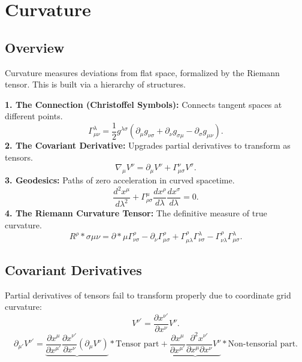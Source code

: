 \documentclass[11pt, a4paper]{report}
\begin{document}
\chapter{Curvature}

\section{Overview}
Curvature measures deviations from flat space, formalized by the Riemann tensor. This is built via a hierarchy of structures.

\textbf{1. The Connection (Christoffel Symbols):} Connects tangent spaces at different points.
\begin{equation}\label{eq:christoffel_preview}
\Gamma_{\mu\nu}^{\lambda} = \frac{1}{2}g^{\lambda\sigma} (\partial_{\mu}g_{\nu\sigma} + \partial_{\nu}g_{\sigma\mu} - \partial_{\sigma}g_{\mu\nu}).
\end{equation}
\textbf{2. The Covariant Derivative:} Upgrades partial derivatives to transform as tensors.
\begin{equation}\label{eq:cov_deriv_preview}
\nabla_{\mu}V^{\nu} = \partial_{\mu}V^{\nu} + \Gamma_{\mu\sigma}^{\nu}V^{\sigma}.
\end{equation}
\textbf{3. Geodesics:} Paths of zero acceleration in curved spacetime.
\begin{equation}\label{eq:geodesic_preview}
\frac{d^{2}x^{\mu}}{d\lambda^{2}} + \Gamma_{\rho\sigma}^{\mu} \frac{dx^{\rho}}{d\lambda} \frac{dx^{\sigma}}{d\lambda} = 0.
\end{equation}
\textbf{4. The Riemann Curvature Tensor:} The definitive measure of true curvature.
\begin{equation}\label{eq:riemann_preview}
{R^{\rho}}*{\sigma\mu\nu} = \partial*{\mu}\Gamma_{\nu\sigma}^{\rho} - \partial_{\nu}\Gamma_{\mu\sigma}^{\rho} + \Gamma_{\mu\lambda}^{\rho}\Gamma_{\nu\sigma}^{\lambda} - \Gamma_{\nu\lambda}^{\rho}\Gamma_{\mu\sigma}^{\lambda}.
\end{equation}

\section{Covariant Derivatives}
Partial derivatives of tensors fail to transform properly due to coordinate grid curvature:
\begin{equation}
V^{\nu'} = \frac{\partial x^{\nu'}}{\partial x^\nu} V^\nu.
\end{equation}
\begin{equation}
\partial_{\mu'} V^{\nu'} = \underbrace{\frac{\partial x^\mu}{\partial x^{\mu'}} \frac{\partial x^{\nu'}}{\partial x^\nu} (\partial_\mu V^\nu)}*{\text{Tensor part}} + \underbrace{\frac{\partial x^\mu}{\partial x^{\mu'}} \frac{\partial^2 x^{\nu'}}{\partial x^\mu \partial x^\nu} V^\nu}*{\text{Non-tensorial part}}.
\end{equation}
\end{document}
